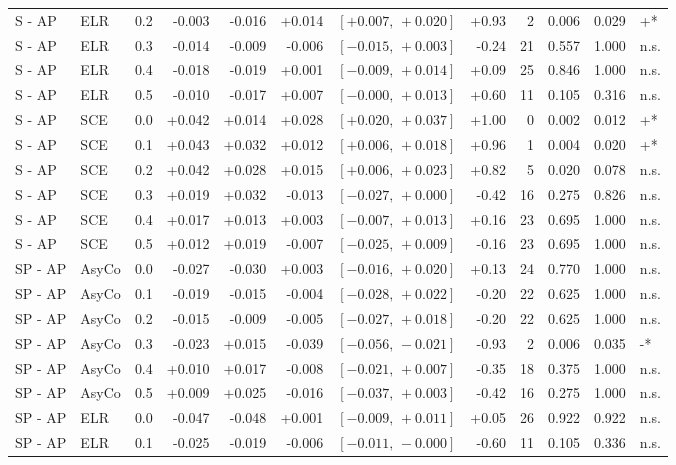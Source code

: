 \begin{landscape}
\begin{scriptsize}
\begin{longtable}{lllrrrrrrrrl}
S - AP & ELR & 0.2 & -0.003 & -0.016 & +0.014 & $[+0.007,\,+0.020]$ & +0.93 & 2 & 0.006 & 0.029 & +* \\
S - AP & ELR & 0.3 & -0.014 & -0.009 & -0.006 & $[-0.015,\,+0.003]$ & -0.24 & 21 & 0.557 & 1.000 & n.s. \\
S - AP & ELR & 0.4 & -0.018 & -0.019 & +0.001 & $[-0.009,\,+0.014]$ & +0.09 & 25 & 0.846 & 1.000 & n.s. \\
S - AP & ELR & 0.5 & -0.010 & -0.017 & +0.007 & $[-0.000,\,+0.013]$ & +0.60 & 11 & 0.105 & 0.316 & n.s. \\
S - AP & SCE & 0.0 & +0.042 & +0.014 & +0.028 & $[+0.020,\,+0.037]$ & +1.00 & 0 & 0.002 & 0.012 & +* \\
S - AP & SCE & 0.1 & +0.043 & +0.032 & +0.012 & $[+0.006,\,+0.018]$ & +0.96 & 1 & 0.004 & 0.020 & +* \\
S - AP & SCE & 0.2 & +0.042 & +0.028 & +0.015 & $[+0.006,\,+0.023]$ & +0.82 & 5 & 0.020 & 0.078 & n.s. \\
S - AP & SCE & 0.3 & +0.019 & +0.032 & -0.013 & $[-0.027,\,+0.000]$ & -0.42 & 16 & 0.275 & 0.826 & n.s. \\
S - AP & SCE & 0.4 & +0.017 & +0.013 & +0.003 & $[-0.007,\,+0.013]$ & +0.16 & 23 & 0.695 & 1.000 & n.s. \\
S - AP & SCE & 0.5 & +0.012 & +0.019 & -0.007 & $[-0.025,\,+0.009]$ & -0.16 & 23 & 0.695 & 1.000 & n.s. \\
SP - AP & AsyCo & 0.0 & -0.027 & -0.030 & +0.003 & $[-0.016,\,+0.020]$ & +0.13 & 24 & 0.770 & 1.000 & n.s. \\
SP - AP & AsyCo & 0.1 & -0.019 & -0.015 & -0.004 & $[-0.028,\,+0.022]$ & -0.20 & 22 & 0.625 & 1.000 & n.s. \\
SP - AP & AsyCo & 0.2 & -0.015 & -0.009 & -0.005 & $[-0.027,\,+0.018]$ & -0.20 & 22 & 0.625 & 1.000 & n.s. \\
SP - AP & AsyCo & 0.3 & -0.023 & +0.015 & -0.039 & $[-0.056,\,-0.021]$ & -0.93 & 2 & 0.006 & 0.035 & -* \\
SP - AP & AsyCo & 0.4 & +0.010 & +0.017 & -0.008 & $[-0.021,\,+0.007]$ & -0.35 & 18 & 0.375 & 1.000 & n.s. \\
SP - AP & AsyCo & 0.5 & +0.009 & +0.025 & -0.016 & $[-0.037,\,+0.003]$ & -0.42 & 16 & 0.275 & 1.000 & n.s. \\
SP - AP & ELR & 0.0 & -0.047 & -0.048 & +0.001 & $[-0.009,\,+0.011]$ & +0.05 & 26 & 0.922 & 0.922 & n.s. \\
SP - AP & ELR & 0.1 & -0.025 & -0.019 & -0.006 & $[-0.011,\,-0.000]$ & -0.60 & 11 & 0.105 & 0.336 & n.s. \\

\end{longtable}
\end{scriptsize}
\end{landscape}
